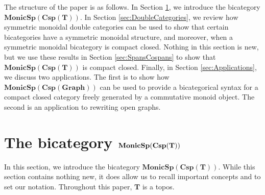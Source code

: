 \documentclass[11pt]{amsart}
\newcommand{\cat}[1]{\mathbf{#1}}
\newcommand{\bimonspcsp}[1]{\mathbf{MonicSp(Csp(#1))}}
\theoremstyle{remark}
\theoremstyle{definition}
\begin{document}
The structure of the paper is as follows.  
In Section 
	\ref{sec:Span cospan bicats}, 
we introduce the bicategory $\bimonspcsp{T}$.  
In Section 
	\ref{sec:DoubleCategories}, 
we review how symmetric monoidal double categories can be used 
to show that certain bicategories have a symmetric monoidal structure,
and moreover, when a symmetric monoidal bicategory is compact closed.  
Nothing in this section is new, 
but we use these results 
in Section \ref{sec:SpansCospans} 
to show that $\bimonspcsp{T}$ is compact closed.
Finally, in Section 
	\ref{sec:Applications}, 
we discuss two applications.
The first is to show how
$\bimonspcsp{Graph}$ can be used to 
provide a bicategorical syntax  
for a compact closed category freely generated 
by a commutative monoid object.
The second is an application to
rewriting open graphs.



\section{The bicategory $\bold{MonicSp(Csp(T))}$} %
\label{sec:Span cospan bicats}

In this section, we introduce the bicategory $\bimonspcsp{T}$.  
While this section contains nothing new, 
it does allow us to recall important concepts and to set our notation. 
Throughout this paper, 
$\cat{T}$ is a topos.
\end{document}
